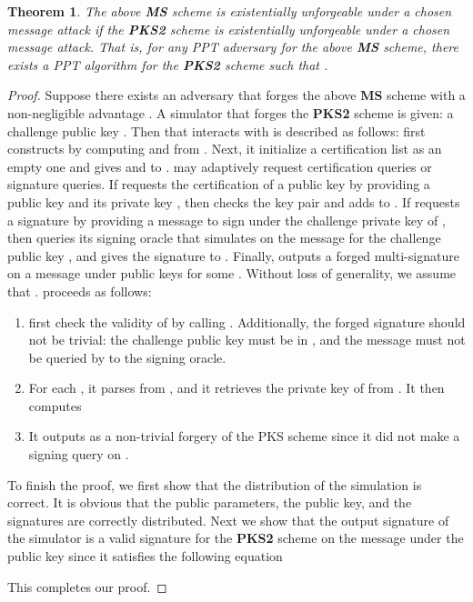 \documentclass[11pt,letterpaper]{article}
\newtheorem{theorem}{Theorem}[section]
\newcommand{\tb}[1]{\textbf{#1}}
\begin{document}
\begin{theorem} \label{thm:ms-prime}
The above \tb{MS} scheme is existentially unforgeable under a chosen message
attack if the \tb{PKS2} scheme is existentially unforgeable under a chosen
message attack. That is, for any PPT adversary  for the above \tb{MS}
scheme, there exists a PPT algorithm  for the \tb{PKS2} scheme such
that
    .
\end{theorem}

\begin{proof}
Suppose there exists an adversary  that forges the above \tb{MS}
scheme with a non-negligible advantage . A simulator  that
forges the \tb{PKS2} scheme is given: a challenge public key . Then
 that interacts with  is described as follows:
 first constructs  by computing  and  from . Next, it initialize a
certification list  as an empty one and gives  and  to
.
 may adaptively request certification queries or signature queries.
If  requests the certification of a public key by providing a public
key  and its private key , then 
checks the key pair and adds  to .
If  requests a signature by providing a message  to sign under the
challenge private key of , then  queries its signing oracle
that simulates  on the message  for the challenge public
key , and gives the signature to .
Finally,  outputs a forged multi-signature  on a message  under public keys  for some . Without loss of generality, we assume
that .  proceeds as follows:
\begin{enumerate}
\item  first check the validity of  by calling
    . Additionally, the forged signature should not be
    trivial: the challenge public key  must be in , and
    the message  must not be queried by  to the signing oracle.

\item For each , it parses  from
    , and it retrieves the private key 
    of  from . It then computes
    

\item It outputs  as a non-trivial
    forgery of the PKS scheme since it did not make a signing query on
    .
\end{enumerate}

To finish the proof, we first show that the distribution of the simulation is
correct. It is obvious that the public parameters, the public key, and the
signatures are correctly distributed. Next we show that the output signature
 of the simulator is a valid signature
for the \tb{PKS2} scheme on the message  under the public key 
since it satisfies the following equation
    
This completes our proof.
\end{proof}
\end{document}
